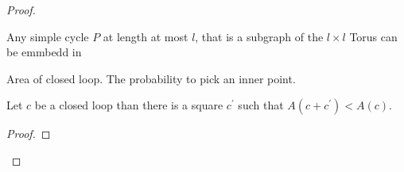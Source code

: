 \begin{proof}
  \begin{claim}
    Any simple cycle $P$ at length at most $l$, that is a subgraph of the $l \times l$ Torus can be emmbedd in  
  \end{claim}

  \begin{definition}
    Area of closed loop. The probability to pick an inner point. 
  \end{definition}

  \begin{claim}
    Let $c$ be a closed loop than there is a square $c^{\prime}$ such that $A(c + c^{\prime}) < A(c)$.
  \end{claim}

  \begin{proof}
  \end{proof}

\end{proof}

%
%    

%
%

